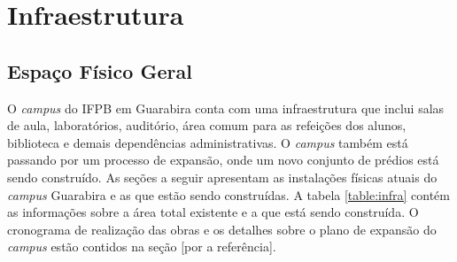\newpage
\section{Infraestrutura}

\subsection{Espaço Físico Geral}

O \textit{campus} do IFPB em Guarabira conta com uma infraestrutura que inclui salas de aula, laboratórios, auditório, área comum para as refeições dos alunos, biblioteca e demais dependências administrativas. O \textit{campus} também está passando por um processo de expansão, onde um novo conjunto de prédios está sendo construído. As seções a seguir apresentam as instalações físicas atuais do \textit{campus} Guarabira e as que estão sendo construídas. A tabela \ref{table:infra} contém as informações sobre a área total existente e a que está sendo construída. O cronograma de realização das obras e os detalhes sobre o plano de expansão do \textit{campus} estão contidos na seção [por a referência].

